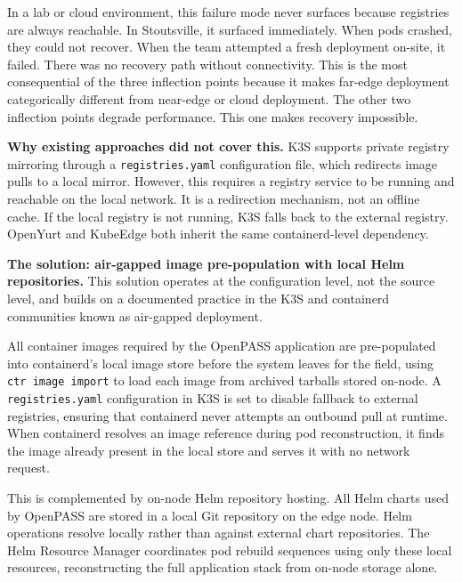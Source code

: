 In a lab or cloud environment, this failure mode never surfaces because registries are always reachable. In Stoutsville, it surfaced immediately. When pods crashed, they could not recover. When the team attempted a fresh deployment on-site, it failed. There was no recovery path without connectivity. This is the most consequential of the three inflection points because it makes far-edge deployment categorically different from near-edge or cloud deployment. The other two inflection points degrade performance. This one makes recovery impossible.

\textbf{Why existing approaches did not cover this.} K3S supports private registry mirroring through a \texttt{registries.yaml} configuration file, which redirects image pulls to a local mirror. However, this requires a registry service to be running and reachable on the local network. It is a redirection mechanism, not an offline cache. If the local registry is not running, K3S falls back to the external registry. OpenYurt and KubeEdge both inherit the same containerd-level dependency.

\textbf{The solution: air-gapped image pre-population with local Helm repositories.} This solution operates at the configuration level, not the source level, and builds on a documented practice in the K3S and containerd communities known as air-gapped deployment.

All container images required by the OpenPASS application are pre-populated into containerd's local image store before the system leaves for the field, using \texttt{ctr image import} to load each image from archived tarballs stored on-node. A \texttt{registries.yaml} configuration in K3S is set to disable fallback to external registries, ensuring that containerd never attempts an outbound pull at runtime. When containerd resolves an image reference during pod reconstruction, it finds the image already present in the local store and serves it with no network request.

This is complemented by on-node Helm repository hosting. All Helm charts used by OpenPASS are stored in a local Git repository on the edge node. Helm operations resolve locally rather than against external chart repositories. The Helm Resource Manager coordinates pod rebuild sequences using only these local resources, reconstructing the full application stack from on-node storage alone.


